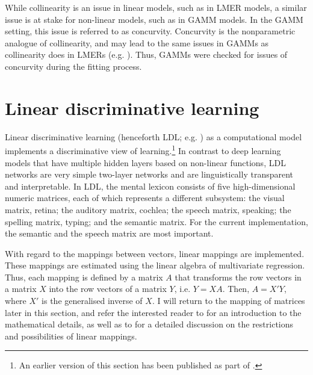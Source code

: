 While collinearity is an issue in linear models, such as in LMER models, a similar issue is at stake for non-linear models, such as in GAMM models. In the GAMM setting, this issue is referred to as concurvity. Concurvity is the nonparametric analogue of collinearity, and may lead to the same issues in GAMMs as collinearity does in LMERs (e.g. \cite{Ramsay2003}). Thus, GAMMs were checked for issues of concurvity during the fitting process.

\section{Linear discriminative learning}\label{section03_3}

Linear discriminative learning (henceforth LDL; e.g. \cite{Baayen2019}) as a computational model implements a discriminative view of learning.\footnote{An earlier version of this section has been published as part of \citet{Schmitz2021b}.} In contrast to deep learning models that have multiple hidden layers based on non-linear functions, LDL networks are very simple two-layer networks and are linguistically transparent and interpretable. In LDL, the mental lexicon consists of five high-dimensional numeric matrices, each of which represents a different subsystem: the visual matrix, retina; the auditory matrix, cochlea; the speech matrix, speaking; the spelling matrix, typing; and the semantic matrix. For the current implementation, the semantic and the speech matrix are most important. 

With regard to the mappings between vectors, linear mappings are implemented. These mappings are estimated using the linear algebra of multivariate regression. Thus, each mapping is defined by a matrix $A$ that transforms the row vectors in a matrix $X$ into the row vectors of a matrix $Y$, i.e. $Y=XA$. Then, $A=X'Y$, where $X'$ is the generalised inverse of $X$. I will return to the mapping of matrices later in this section, and refer the interested reader to \citet{Baayen2019} for an introduction to the mathematical details, as well as to \citet{Milin2017Feldman} for a detailed discussion on the restrictions and possibilities of linear mappings.

